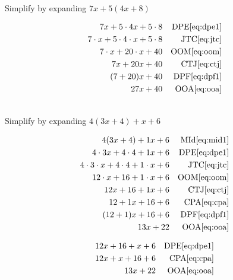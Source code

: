 \documentclass[20150903-160354-rs2.2-MarksMathNotebook.tex]{subfiles}
\begin{document}
\begin{example}[id:20141109-093419] \label{20141109-093419}  \hfill \\

Simplify by expanding $7x +5(4x+8)$

\soln

\solnsteps
\begin{align*}
7x + 5 \cdot 4x + 5 \cdot 8 && \text{DPE} \eqref{eq:dpe1} \\
7 \cdot x + 5 \cdot 4 \cdot x + 5 \cdot 8 && \text{JTC} \eqref{eq:jtc} \\
7 \cdot x + 20 \cdot x + 40 && \text{OOM} \eqref{eq:oom} \\
7x + 20x + 40 && \text{CTJ} \eqref{eq:ctj} \\
(7+20)x + 40 && \text{DPF} \eqref{eq:dpf1} \\
27x+40 && \text{OOA} \eqref{eq:ooa}
\end{align*}
\end{example}

\begin{example}[id:20141109-094928] \label{20141109-094928}  \hfill \\

Simplify by expanding $4(3x+4)+x+6$

\soln

\solnsteps
\begin{align*}
4(3x+4)+1x+6 && \text{MId} \eqref{eq:mid1} \\
4 \cdot 3x + 4 \cdot 4 + 1x + 6 && \text{DPE} \eqref{eq:dpe1} \\
4 \cdot 3 \cdot x + 4 \cdot 4 + 1 \cdot x + 6 && \text{JTC} \eqref{eq:jtc} \\
12 \cdot x + 16 + 1 \cdot x + 6 && \text{OOM} \eqref{eq:oom} \\
12x+16+1x+6 && \text{CTJ} \eqref{eq:ctj} \\
12+1x+16+6 && \text{CPA} \eqref{eq:cpa} \\
(12+1)x+16+6 && \text{DPF} \eqref{eq:dpf1} \\
13x+22 && \text{OOA} \eqref{eq:ooa}
\end{align*}

\soln

\lesssteps
\begin{align*}
12x + 16 + x+ 6 && \text{DPE} \eqref{eq:dpe1} \\
12x + x + 16 + 6 && \text{CPA} \eqref{eq:cpa} \\
13x+22 && \text{OOA} \eqref{eq:ooa}
\end{align*}

\end{example}
\end{document}
